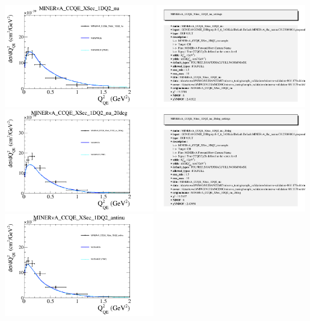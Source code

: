 \documentclass{article}
\begin{document}
\centering
\includegraphics[width=0.49\textwidth]{figures/nuisance_MINERvA_CCQE_XSec_1DQ2_nu_comp.png}
\includegraphics[width=0.49\textwidth]{figures/nuisance_MINERvA_CCQE_XSec_1DQ2_nu_info.png}
\centering
\includegraphics[width=0.49\textwidth]{figures/nuisance_MINERvA_CCQE_XSec_1DQ2_nu_20deg_comp.png}
\includegraphics[width=0.49\textwidth]{figures/nuisance_MINERvA_CCQE_XSec_1DQ2_nu_20deg_info.png}
\centering
\includegraphics[width=0.49\textwidth]{figures/nuisance_MINERvA_CCQE_XSec_1DQ2_antinu_comp.png}
\end{document}
